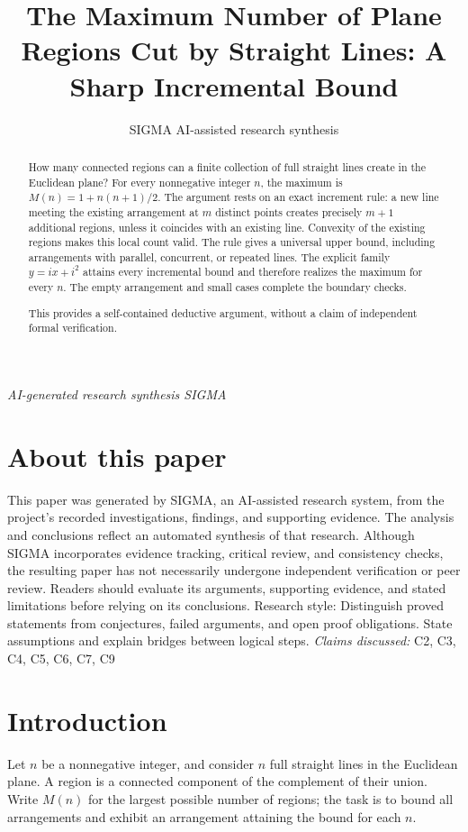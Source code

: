 \documentclass[11pt]{article}
\title{The Maximum Number of Plane Regions Cut by Straight Lines: A Sharp Incremental Bound}
\date{}
\author{SIGMA AI-assisted research synthesis}
\begin{document}
\maketitle
\begin{center}\small\textit{AI-generated research synthesis \textperiodcentered{} SIGMA}\end{center}

\begin{abstract}
How many connected regions can a finite collection of full straight lines create in the Euclidean plane? For every nonnegative integer $n$, the maximum is $M(n)=1+n(n+1)/2$. The argument rests on an exact increment rule: a new line meeting the existing arrangement at $m$ distinct points creates precisely $m+1$ additional regions, unless it coincides with an existing line. Convexity of the existing regions makes this local count valid. The rule gives a universal upper bound, including arrangements with parallel, concurrent, or repeated lines. The explicit family $y=ix+i^2$ attains every incremental bound and therefore realizes the maximum for every $n$. The empty arrangement and small cases complete the boundary checks.

This provides a self-contained deductive argument, without a claim of independent formal verification.
\end{abstract}
\section*{About this paper}
This paper was generated by SIGMA, an AI-assisted research system, from the project's recorded investigations, findings, and supporting evidence.
The analysis and conclusions reflect an automated synthesis of that research. Although SIGMA incorporates evidence tracking, critical review, and consistency checks, the resulting paper has not necessarily undergone independent verification or peer review.
Readers should evaluate its arguments, supporting evidence, and stated limitations before relying on its conclusions.
Research style: Distinguish proved statements from conjectures, failed arguments, and open proof obligations. State assumptions and explain bridges between logical steps.
\textit{Claims discussed: }C2, C3, C4, C5, C6, C7, C9
\section{Introduction}
Let $n$ be a nonnegative integer, and consider $n$ full straight lines in the Euclidean plane. A region is a connected component of the complement of their union. Write $M(n)$ for the largest possible number of regions; the task is to bound all arrangements and exhibit an arrangement attaining the bound for each $n$.
\end{document}
